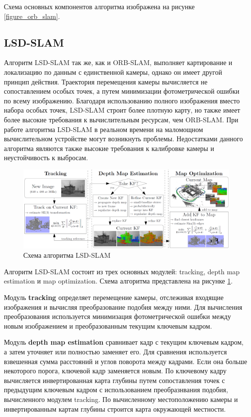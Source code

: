 \documentclass{mipt-thesis-ms}
\begin{document}
	Схема основных компонентов алгоритма изображена на рисунке \ref{figure_orb_slam}.
	
	\subsection{LSD-SLAM}
	
	Алгоритм LSD-SLAM \cite{engel2014lsd} так же, как и ORB-SLAM, выполняет картирование и локализацию по данным с единственной камеры, однако он имеет другой принцип действия. Траектория перемещения камеры вычисляется не сопоставлением особых точек, а путем минимизации фотометрической ошибки по всему изображению. Благодаря использованию полного изображения вместо набора особых точек, LSD-SLAM строит более плотную карту, но также имеет более высокие требования к вычислительным ресурсам, чем ORB-SLAM. При работе алгоритма LSD-SLAM в реальном времени на маломощном вычислительном устройстве могут возникнуть проблемы. Недостатками данного алгоритма являются также высокие требования к калибровке камеры и неустойчивость к выбросам.
	
	\begin{figure}
		\includegraphics[width=1.0\textwidth]{img/lsd_slam_scheme.png}
		\caption{Схема алгоритма LSD-SLAM}
		\label{figure_lsd_slam}
	\end{figure}
	
	Алгоритм LSD-SLAM состоит из трех основных модулей: tracking, depth map estimation и map optimization. Схема алгоритма представлена на рисунке \ref{figure_lsd_slam}.
	
	Модуль \textbf{tracking} определяет перемещение камеры, отслеживая входящие изображения и вычисляя преобразование подобия между ними. Для вычисления преобразования используется минимизация фотометрической ошибки между новым изображением и преобразованным текущим ключевым кадром.
	
	Модуль \textbf{depth map estimation} сравнивает кадр с текущим ключевым кадром, а затем уточняет или полностью заменяет его. Для сравнения используется взвешенная сумма расстояний и углов поворота между кадрами. Если она больше некоторого порога, ключевой кадр заменяется новым. По ключевому кадру вычисляется инвертированная карта глубины путем сопоставления точек с предыдущим ключевым кадром с использованием преобразнвания подобия, вычисленного модулем tracking. По вычисленному местоположению камеры и инвертированным картам глубины строится карта окружающей местности.
	
\end{document}
